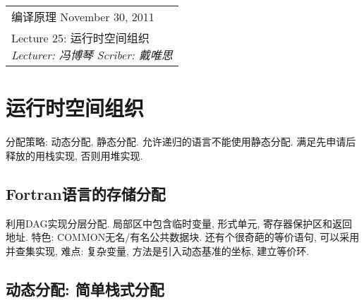 \def\lecture{25}
\clearpage \noindent\begin{tabularx}{\linewidth}{|X|}
\hline \vskip -2mm
{\sf 编译原理} \hfill November 30, 2011 \\
{\centering \sf \large Lecture \lecture:
运行时空间组织 \\ }
\textsl{Lecturer: 冯博琴 \hfill Scriber: 戴唯思}\\ \hline
\end{tabularx}
\setcounter{section}{0}
\renewcommand{\thepage}{\lecture -\arabic{page}}

\section{运行时空间组织}

    分配策略: 动态分配, 静态分配. 允许递归的语言不能使用静态分配. 满足先申请后释放的用栈实现, 否则用堆实现.

    \subsection{Fortran语言的存储分配}

        利用DAG实现分层分配. 局部区中包含临时变量, 形式单元, 寄存器保护区和返回地址. 特色: COMMON无名/有名公共数据块. 还有个很奇葩的等价语句, 可以采用并查集实现, 难点: 复杂变量, 方法是引入动态基准的坐标, 建立等价环.

    \subsection{动态分配: 简单栈式分配}

        
